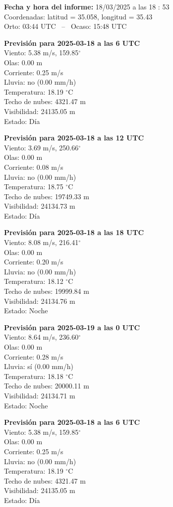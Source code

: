 {\bf Fecha y hora del informe:} 18/03/2025 a las 18 : 53\\
Coordenadas: latitud = 35.058, longitud = 35.43\\
Orto: 03:44 UTC \, -- \, Ocaso: 15:48 UTC

{\bf Previsión para 2025-03-18 a las 6 UTC}\\
  Viento: 5.38 m/s, 159.85$^\circ$\\
  Olas: 0.00 m\\
  Corriente: 0.25 m/s\\
  Lluvia: no (0.00 mm/h)\\
  Temperatura: 18.19 $^\circ$C\\
  Techo de nubes: 4321.47 m\\
  Visibilidad: 24135.05 m\\
  Estado: Día

{\bf Previsión para 2025-03-18 a las 12 UTC}\\
  Viento: 3.69 m/s, 250.66$^\circ$\\
  Olas: 0.00 m\\
  Corriente: 0.08 m/s\\
  Lluvia: no (0.00 mm/h)\\
  Temperatura: 18.75 $^\circ$C\\
  Techo de nubes: 19749.33 m\\
  Visibilidad: 24134.73 m\\
  Estado: Día

{\bf Previsión para 2025-03-18 a las 18 UTC}\\
  Viento: 8.08 m/s, 216.41$^\circ$\\
  Olas: 0.00 m\\
  Corriente: 0.20 m/s\\
  Lluvia: no (0.00 mm/h)\\
  Temperatura: 18.12 $^\circ$C\\
  Techo de nubes: 19999.84 m\\
  Visibilidad: 24134.76 m\\
  Estado: Noche

{\bf Previsión para 2025-03-19 a las 0 UTC}\\
  Viento: 8.64 m/s, 236.60$^\circ$\\
  Olas: 0.00 m\\
  Corriente: 0.28 m/s\\
  Lluvia: sí (0.00 mm/h)\\
  Temperatura: 18.18 $^\circ$C\\
  Techo de nubes: 20000.11 m\\
  Visibilidad: 24134.71 m\\
  Estado: Noche

{\bf Previsión para 2025-03-18 a las 6 UTC}\\
  Viento: 5.38 m/s, 159.85$^\circ$\\
  Olas: 0.00 m\\
  Corriente: 0.25 m/s\\
  Lluvia: no (0.00 mm/h)\\
  Temperatura: 18.19 $^\circ$C\\
  Techo de nubes: 4321.47 m\\
  Visibilidad: 24135.05 m\\
  Estado: Día

